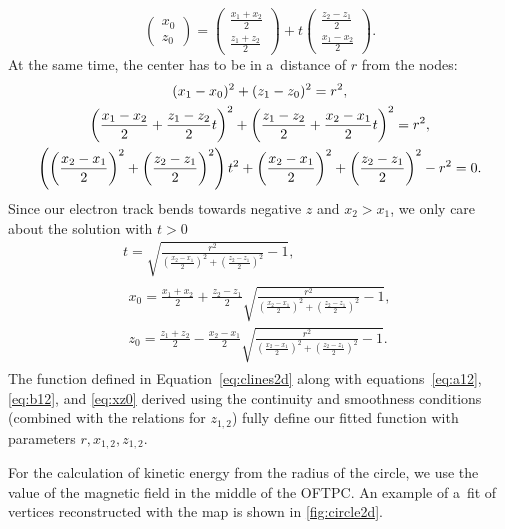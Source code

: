 				\begin{equation}
					\begin{pmatrix} x_0\\ z_0 \end{pmatrix} = \begin{pmatrix} \frac{x_1+x_2}{2}\\ \frac{z_1+z_2}{2} \end{pmatrix} + t \begin{pmatrix} \frac{z_2-z_1}{2}\\ \frac{x_1-x_2}{2} \end{pmatrix}.
				\end{equation}
			At the same time, the center has to be in a~distance of $r$ from the nodes:
				\begin{gather}
					(x_1-x_0)^2 + (z_1-z_0)^2 = r^2,\notag\\
					\left(\frac{x_1-x_2}{2}+\frac{z_1-z_2}{2}t\right)^2 + \left(\frac{z_1-z_2}{2}+\frac{x_2-x_1}{2}t\right)^2 = r^2,\notag\\
					\left(\left(\frac{x_2-x_1}{2}\right)^2+\left(\frac{z_2-z_1}{2}\right)^2\right)t^2+\left(\frac{x_2-x_1}{2}\right)^2+\left(\frac{z_2-z_1}{2}\right)^2-r^2=0.
				\end{gather}
			Since our electron track bends towards negative $z$ and $x_2 > x_1$, we only care about the solution with $t>0$
				\begin{gather}
					t = \sqrt{\frac{r^2}{\left(\frac{x_2-x_1}{2}\right)^2+\left(\frac{z_2-z_1}{2}\right)^2}-1},\\
					\begin{aligned}
						x_0 = \frac{x_1+x_2}{2} + \frac{z_2-z_1}{2} \sqrt{\frac{r^2}{\left(\frac{x_2-x_1}{2}\right)^2+\left(\frac{z_2-z_1}{2}\right)^2}-1},\label{eq:xz0}\\
						z_0 = \frac{z_1+z_2}{2} - \frac{x_2-x_1}{2} \sqrt{\frac{r^2}{\left(\frac{x_2-x_1}{2}\right)^2+\left(\frac{z_2-z_1}{2}\right)^2}-1}.
					\end{aligned}
				\end{gather}
			The function defined in Equation~\ref{eq:clines2d} along with equations~\ref{eq:a12}, \ref{eq:b12}, and \ref{eq:xz0} derived using the continuity and smoothness conditions (combined with the relations for $z_{1,2}$) fully define our fitted function with parameters $r,x_{1,2},z_{1,2}$.
			
			For the calculation of kinetic energy from the radius of the circle, we use the value of the magnetic field in the middle of the \ac{OFTPC}. An example of a~fit of vertices reconstructed with the map is shown in \cref{fig:circle2d}.
			
